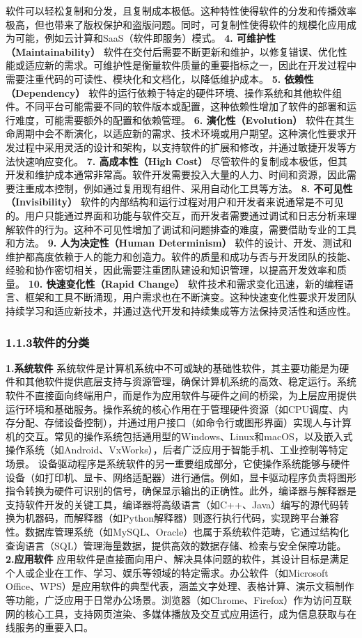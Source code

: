 软件可以轻松复制和分发，且复制成本极低。这种特性使得软件的分发和传播效率极高，但也带来了版权保护和盗版问题。同时，可复制性使得软件的规模化应用成为可能，例如云计算和SaaS（软件即服务）模式。 \textbf{4. 可维护性（Maintainability）} 软件在交付后需要不断更新和维护，以修复错误、优化性能或适应新的需求。可维护性是衡量软件质量的重要指标之一，因此在开发过程中需要注重代码的可读性、模块化和文档化，以降低维护成本。 \textbf{5. 依赖性（Dependency）} 软件的运行依赖于特定的硬件环境、操作系统和其他软件组件。不同平台可能需要不同的软件版本或配置，这种依赖性增加了软件的部署和运行难度，可能需要额外的配置和依赖管理。 \textbf{6. 演化性（Evolution）} 软件在其生命周期中会不断演化，以适应新的需求、技术环境或用户期望。这种演化性要求开发过程中采用灵活的设计和架构，以支持软件的扩展和修改，并通过敏捷开发等方法快速响应变化。 \textbf{7. 高成本性（High Cost）} 尽管软件的复制成本极低，但其开发和维护成本通常非常高。软件开发需要投入大量的人力、时间和资源，因此需要注重成本控制，例如通过复用现有组件、采用自动化工具等方法。 \textbf{8. 不可见性（Invisibility）} 软件的内部结构和运行过程对用户和开发者来说通常是不可见的。用户只能通过界面和功能与软件交互，而开发者需要通过调试和日志分析来理解软件的行为。这种不可见性增加了调试和问题排查的难度，需要借助专业的工具和方法。 \textbf{9. 人为决定性（Human Determinism）} 软件的设计、开发、测试和维护都高度依赖于人的能力和创造力。软件的质量和成功与否与开发团队的技能、经验和协作密切相关，因此需要注重团队建设和知识管理，以提高开发效率和质量。 \textbf{10. 快速变化性（Rapid Change）} 软件技术和需求变化迅速，新的编程语言、框架和工具不断涌现，用户需求也在不断演变。这种快速变化性要求开发团队持续学习和适应新技术，并通过迭代开发和持续集成等方法保持灵活性和适应性。 \subsubsection{1.1.3软件的分类}\label{ux8f6fux4ef6ux7684ux5206ux7c7b} \textbf{1.系统软件} 系统软件是计算机系统中不可或缺的基础性软件，其主要功能是为硬件和其他软件提供底层支持与资源管理，确保计算机系统的高效、稳定运行。系统软件不直接面向终端用户，而是作为应用软件与硬件之间的桥梁，为上层应用提供运行环境和基础服务。操作系统的核心作用在于管理硬件资源（如CPU调度、内存分配、存储设备控制），并通过用户接口（如命令行或图形界面）实现人与计算机的交互。常见的操作系统包括通用型的Windows、Linux和macOS，以及嵌入式操作系统（如Android、VxWorks），后者广泛应用于智能手机、工业控制等特定场景。 设备驱动程序是系统软件的另一重要组成部分，它使操作系统能够与硬件设备（如打印机、显卡、网络适配器）进行通信。例如，显卡驱动程序负责将图形指令转换为硬件可识别的信号，确保显示输出的正确性。此外，编译器与解释器是支持软件开发的关键工具，编译器将高级语言（如C++、Java）编写的源代码转换为机器码，而解释器（如Python解释器）则逐行执行代码，实现跨平台兼容性。数据库管理系统（如MySQL、Oracle）也属于系统软件范畴，它通过结构化查询语言（SQL）管理海量数据，提供高效的数据存储、检索与安全保障功能。 \textbf{2.应用软件} 应用软件是直接面向用户、解决具体问题的软件，其设计目标是满足个人或企业在工作、学习、娱乐等领域的特定需求。办公软件（如Microsoft Office、WPS）是应用软件的典型代表，涵盖文字处理、表格计算、演示文稿制作等功能，广泛应用于日常办公场景。浏览器（如Chrome、Firefox）作为访问互联网的核心工具，支持网页渲染、多媒体播放及交互式应用运行，成为信息获取与在线服务的重要入口。 